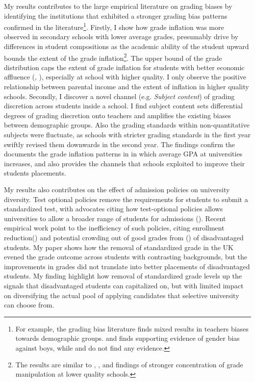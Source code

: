 My results contributes to the large empirical literature on grading biases by identifying the institutions that exhibited a stronger grading bias patterns confirmed in the literature\footnote{For example, the grading bias literature finds mixed results in teachers biases towards demographic groups. \cite{10.1093/qje/qjz008} and \cite{lavy2018} finds supporting evidence of gender bias against boys, while \cite{hanna2012} and \cite{diamond} do not find any evidence.}. Firstly, I show how grade inflation was more observed in secondary schools with lower average grades, presumably drive by differences in student compositions as the academic ability of the student upward bounds the extent of the grade inflation\footnote{The results are similar to \cite{figlio2004}, \cite{10.1162/00335530360698441}, and \cite{dee2019} findings of stronger concentration of grade manipulation at lower quality schools.}. The upper bound of the grade distribution caps the extent of grade inflation for students with better economic affluence (\cite{hanna2012}, \cite{burgess2013}), especially at school with higher quality. I only observe the positive relationship between parental income and the extent of inflation in higher quality schools. Secondly, I discover a novel channel (e.g. \emph{Subject content}) of grading discretion across students inside a school. I find subject content sets differential degrees of grading discretion onto teachers and amplifies the existing biases between demographic groups. Also the grading standards within non-quantitative subjects were fluctuate, as schools with stricter grading standards in the first year swiftly revised them downwards in the second year. The findings confirm the documents the grade inflation patterns in \cite{denning2023} in which average GPA at universities increases, and also provides the channels that schools exploited to improve their students placements. 

My results also contributes on the effect of admission policies on university diversity. Test optional policies remove the requirements for students to submit a standardized test, with advocates citing how test-optional policies allows universities to allow a broader range of students for admissions (\cite{10.1257/aer.20231407}). Recent empirical work point to the inefficiency of such policies, citing enrollment reduction(\cite{NBERw34260}) and potential crowding out of good grades from  (\cite{NBERw33389}) of disadvantaged students. My paper shows how the removal of standardized grade in the UK evened the grade outcome across students with contrasting backgrounds, but the improvements in grades did not translate into better placements of disadvantaged students. My finding highlight how removal of standardized grade levels up the signals that disadvantaged students can capitalized on, but with limited impact on diversifying the actual pool of applying candidates that selective university can choose from. 

